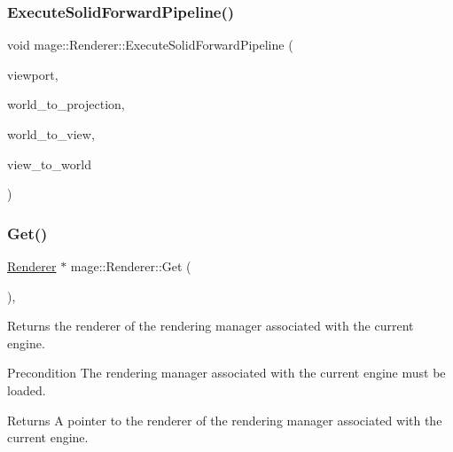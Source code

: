 \hypertarget{classmage_1_1_renderer_a32a06dca63b1c842ffb92007ca8144a9}{}\label{classmage_1_1_renderer_a32a06dca63b1c842ffb92007ca8144a9} 
\subsubsection{\texorpdfstring{Execute\+Solid\+Forward\+Pipeline()}{ExecuteSolidForwardPipeline()}}
{\footnotesize\ttfamily void mage\+::\+Renderer\+::\+Execute\+Solid\+Forward\+Pipeline (\begin{DoxyParamCaption}\item[{const \hyperlink{classmage_1_1_viewport}{Viewport} \&}]{viewport,  }\item[{F\+X\+M\+M\+A\+T\+R\+IX}]{world\+\_\+to\+\_\+projection,  }\item[{C\+X\+M\+M\+A\+T\+R\+IX}]{world\+\_\+to\+\_\+view,  }\item[{C\+X\+M\+M\+A\+T\+R\+IX}]{view\+\_\+to\+\_\+world }\end{DoxyParamCaption})\hspace{0.3cm}{\ttfamily [private]}}

\hypertarget{classmage_1_1_renderer_a401f8e17f60d8546b30de22943ac35db}{}\label{classmage_1_1_renderer_a401f8e17f60d8546b30de22943ac35db} 
\subsubsection{\texorpdfstring{Get()}{Get()}}
{\footnotesize\ttfamily \hyperlink{classmage_1_1_renderer}{Renderer} $\ast$ mage\+::\+Renderer\+::\+Get (\begin{DoxyParamCaption}{ }\end{DoxyParamCaption})\hspace{0.3cm}{\ttfamily [static]}, {\ttfamily [noexcept]}}

Returns the renderer of the rendering manager associated with the current engine.

\begin{DoxyPrecond}{Precondition}
The rendering manager associated with the current engine must be loaded. 
\end{DoxyPrecond}
\begin{DoxyReturn}{Returns}
A pointer to the renderer of the rendering manager associated with the current engine. 
\end{DoxyReturn}
\hypertarget{classmage_1_1_renderer_a52fd71822fe54161ad505a0361ec6c75}{}\label{classmage_1_1_renderer_a52fd71822fe54161ad505a0361ec6c75} 
